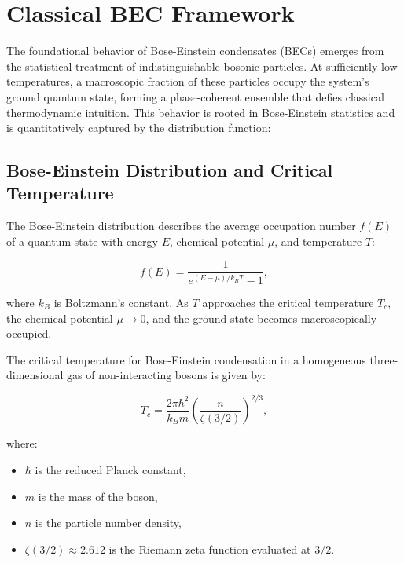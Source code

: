 \documentclass{article}
\theoremstyle{plain}
\begin{document}
\section{Classical BEC Framework}

The foundational behavior of Bose-Einstein condensates (BECs) emerges from the statistical treatment of indistinguishable bosonic particles. At sufficiently low temperatures, a macroscopic fraction of these particles occupy the system’s ground quantum state, forming a phase-coherent ensemble that defies classical thermodynamic intuition. This behavior is rooted in Bose-Einstein statistics and is quantitatively captured by the distribution function:

\subsection{Bose-Einstein Distribution and Critical Temperature}

The Bose-Einstein distribution describes the average occupation number \( f(E) \) of a quantum state with energy \( E \), chemical potential \( \mu \), and temperature \( T \):

\begin{equation}
f(E) = \frac{1}{e^{(E - \mu)/k_B T} - 1},
\end{equation}

where \( k_B \) is Boltzmann’s constant. As \( T \) approaches the critical temperature \( T_c \), the chemical potential \( \mu \rightarrow 0 \), and the ground state becomes macroscopically occupied.

The critical temperature for Bose-Einstein condensation in a homogeneous three-dimensional gas of non-interacting bosons is given by:

\begin{equation}
T_c = \frac{2\pi \hbar^2}{k_B m} \left( \frac{n}{\zeta(3/2)} \right)^{2/3},
\end{equation}

where:
\begin{itemize}
  \item \( \hbar \) is the reduced Planck constant,
  \item \( m \) is the mass of the boson,
  \item \( n \) is the particle number density,
  \item \( \zeta(3/2) \approx 2.612 \) is the Riemann zeta function evaluated at \( 3/2 \).
\end{itemize}
\end{document}
